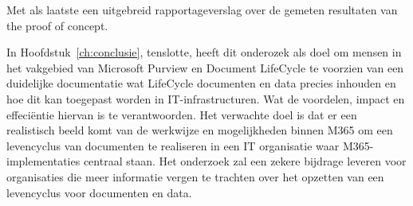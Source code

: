 Met als laatste een uitgebreid rapportageverslag over de gemeten resultaten van the proof of concept.



In Hoofdstuk~\ref{ch:conclusie}, tenslotte, heeft dit onderozek als doel om mensen in het vakgebied van Microsoft Purview en Document LifeCycle te voorzien van een duidelijke documentatie wat LifeCycle documenten en data precies inhouden en hoe dit kan toegepast worden in IT-infrastructuren. Wat de voordelen, impact en effeciëntie hiervan is te verantwoorden. Het verwachte doel is dat er een realistisch beeld komt van de werkwijze en mogelijkheden binnen M365 om een levencyclus van documenten te realiseren in een IT organisatie waar M365-implementaties centraal staan.
Het onderzoek zal een zekere bijdrage leveren voor organisaties die meer informatie vergen te trachten over het opzetten van een levencyclus voor documenten en data.


